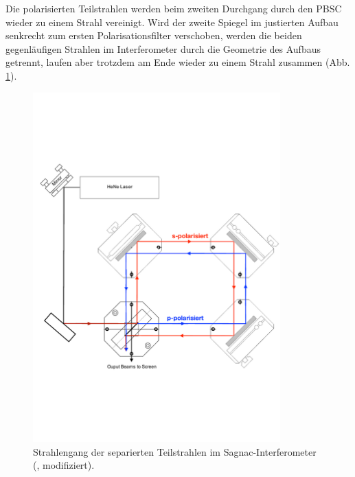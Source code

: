 Die polarisierten Teilstrahlen werden beim zweiten Durchgang durch den PBSC wieder zu einem Strahl vereinigt.
Wird der zweite Spiegel im justierten Aufbau senkrecht zum ersten Polarisationsfilter verschoben, werden die beiden gegenläufigen Strahlen im Interferometer durch die Geometrie des Aufbaus getrennt, laufen aber trotzdem am Ende wieder zu einem Strahl zusammen (Abb. \ref{fig:int_teil}).
\begin{figure}[h!]
  \centering
  \includegraphics[width=0.85\textwidth]{content/images/interferometer_teil.pdf}
  \caption{Strahlengang der separierten Teilstrahlen im Sagnac-Interferometer  (\cite{teachspin}, modifiziert).}
  \label{fig:int_teil}
\end{figure}
